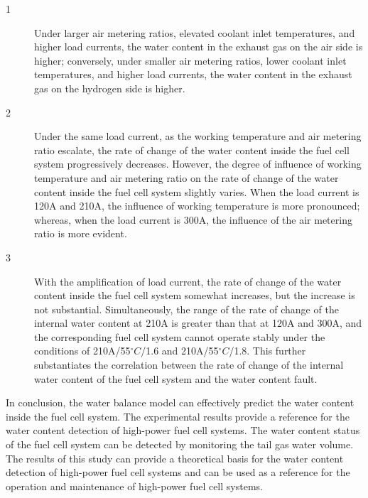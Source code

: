 \begin{description}
	\item [1] Under larger air metering ratios, elevated coolant inlet temperatures, and higher load currents, the water content in the exhaust gas on the air side is higher; conversely, under smaller air metering ratios, lower coolant inlet temperatures, and higher load currents, the water content in the exhaust gas on the hydrogen side is higher.
	\item [2] Under the same load current, as the working temperature and air metering ratio escalate, the rate of change of the water content inside the fuel cell system progressively decreases. However, the degree of influence of working temperature and air metering ratio on the rate of change of the water content inside the fuel cell system slightly varies. When the load current is 120A and 210A, the influence of working temperature is more pronounced; whereas, when the load current is 300A, the influence of the air metering ratio is more evident.
	\item [3] With the amplification of load current, the rate of change of the water content inside the fuel cell system somewhat increases, but the increase is not substantial. Simultaneously, the range of the rate of change of the internal water content at 210A is greater than that at 120A and 300A, and the corresponding fuel cell system cannot operate stably under the conditions of 210A/55$^{\circ}C$/1.6 and 210A/55$^{\circ}C$/1.8. This further substantiates the correlation between the rate of change of the internal water content of the fuel cell system and the water content fault.
\end{description}

In conclusion, the water balance model can effectively predict the water content inside the fuel cell system. The experimental results provide a reference for the water content detection of high-power fuel cell systems. The water content status of the fuel cell system can be detected by monitoring the tail gas water volume. The results of this study can provide a theoretical basis for the water content detection of high-power fuel cell systems and can be used as a reference for the operation and maintenance of high-power fuel cell systems.
